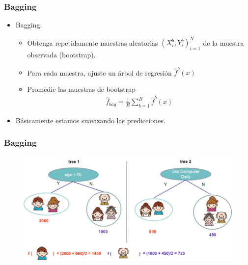 \documentclass[
  shownotes,
  xcolor={svgnames},
  hyperref={colorlinks,citecolor=DarkBlue,linkcolor=andesred,urlcolor=DarkBlue}
  , aspectratio=169]{beamer}
\begin{document}
\begin{frame}[fragile]
\frametitle{Bagging}
\begin{itemize}
   \item Bagging:
    \begin{itemize}
       \item Obtenga repetidamente muestras aleatorias $(X_i^b,Y_i^b)_{i=1}^N$ de la muestra observada (bootstrap).
       \medskip
       \item Para cada muestra, ajuste un árbol de regresión $\hat{f}^b(x)$
       \medskip
       \item Promedie las muestras de bootstrap 
        \begin{align}
         \hat{f}_{bag} =\frac{1}{B}\sum_{b=1}^B \hat{f}^b(x)
        \end{align}
      \end{itemize}
  \item Básicamente estamos suavizando las predicciones.

  \end{itemize}

\end{frame}

\begin{frame}[fragile]
\frametitle{Bagging}



\begin{figure}[H] \centering
            \captionsetup{justification=centering}
              \includegraphics[scale=0.4]{figures/twocart_gboost.jpeg}
 \end{figure}

\end{frame}
\end{document}

